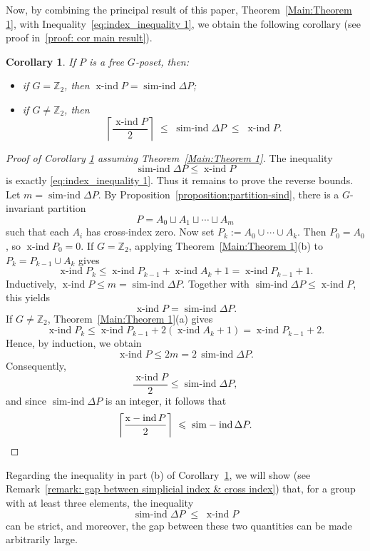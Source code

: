 \documentclass[preprint,12pt]{article}
\renewcommand{\le}{\leqslant}
\newtheorem{corollary}[theorem]{Corollary}
\theoremstyle{definition}
\theoremstyle{remark}
\numberwithin{equation}{section}
\DeclareMathOperator{\xind}{x-ind}
\DeclareMathOperator{\sind}{sim-ind}
\begin{document}
Now, by combining the principal result of this paper, Theorem~\ref{Main:Theorem 1}, with Inequality~\ref{eq:index_inequality 1}, we obtain the following corollary (see proof in~\ref{proof: cor main result}).

\begin{corollary}
\label{cor: main result}
If $P$ is a free $G$-poset, then:
\begin{itemize}
\item[(a)] if $G=\mathbb{Z}_2$, then $\xind P=\sind \Delta P$;
\item[(b)] if $G\neq \mathbb{Z}_2$, then
\[
\left\lceil\frac{\xind P}{2}\right\rceil\;\le\;\sind\Delta P\;\le\;\xind P.
\]
\end{itemize}
\end{corollary}

\label{proof: cor main result}
\begin{proof}[Proof of Corollary \ref{cor: main result} assuming Theorem~\ref{Main:Theorem 1}]
The inequality
\[
\sind \Delta P\le \xind P
\]
is exactly \eqref{eq:index_inequality 1}. Thus it remains to prove the reverse bounds. Let \(m=\sind\Delta P\). By Proposition~\ref{proposition:partition-sind}, there is a \(G\)-invariant partition
\[
P=A_0\sqcup A_1\sqcup\cdots\sqcup A_m
\]
such that each \(A_i\) has cross-index zero. Now set \(P_k:=A_0\cup\cdots\cup A_k\). Then \(P_0=A_0\), so \(\xind P_0=0\). If \(G=\mathbb Z_2\), applying Theorem~\ref{Main:Theorem 1}(b) to \(P_k=P_{k-1}\cup A_k\) gives
\[
\xind P_k\le \xind P_{k-1}+\xind A_k+1=\xind P_{k-1} + 1.
\]
Inductively, \(\xind P\le m=\sind\Delta P\). Together with \(\sind\Delta P\le \xind P\), this yields
\[
\xind P=\sind\Delta P.
\]
If \(G\neq \mathbb Z_2\), Theorem~\ref{Main:Theorem 1}(a) gives
\[
\xind P_k\le \xind P_{k-1}+2(\xind A_k+1)=\xind P_{k-1}+2.
\]
Hence, by induction, we obtain
\[
\xind P\le 2m=2\,\sind\Delta P.
\]
Consequently,
\[
\frac{\xind P}{2}\le \sind\Delta P,
\]
and since $\sind\Delta P$ is an integer, it follows that
\[
\left\lceil\frac{\xind P}{2}\right\rceil\;\le\;\sind\Delta P.\qedhere
\]
\end{proof}

Regarding the inequality in part (b) of Corollary~\ref{cor: main result}, we will show (see Remark~\ref{remark: gap between simplicial index & cross index}) that, for a group with at least three elements, the inequality
\[
\sind \Delta P\;\le\;\xind P
\]
can be strict, and moreover, the gap between these two quantities can be made arbitrarily large.
\end{document}
